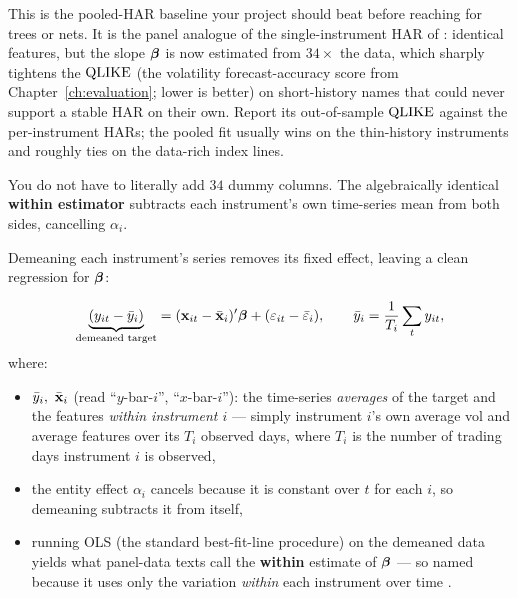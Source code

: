 \begin{projectconnection}
This is the pooled-HAR baseline your project should beat before reaching for
trees or nets.  It is the panel analogue of the single-instrument HAR of
\citet{Corsi2009}: identical features, but the slope $\bm{\beta}$ is now estimated
from $34\times$ the data, which sharply tightens the $\operatorname{QLIKE}$ (the volatility
forecast-accuracy score from Chapter~\ref{ch:evaluation}; lower is better) on
short-history names that could never support a stable HAR on their own.  Report its
out-of-sample $\operatorname{QLIKE}$ against the per-instrument HARs; the pooled fit usually wins on the
thin-history instruments and roughly ties on the data-rich index lines.
\end{projectconnection}

You do not have to literally add $34$ dummy columns.  The algebraically
identical \textbf{within estimator} subtracts each instrument's own time-series
mean from both sides, cancelling $\alpha_i$.

Demeaning each instrument's series removes its fixed effect,
leaving a clean regression for $\bm{\beta}$:

\begin{equation}\label{eq:panel-within}
  \underbrace{(y_{it} - \bar{y}_i)}_{\text{demeaned target}}
  = (\mathbf{x}_{it} - \bar{\mathbf{x}}_i)'\bm{\beta} + (\varepsilon_{it} - \bar{\varepsilon}_i),
  \qquad
  \bar{y}_i = \frac{1}{T_i}\sum_{t} y_{it},
\end{equation}
where:
\begin{itemize}[nosep]
  \item $\bar{y}_i,\ \bar{\mathbf{x}}_i$ (read ``$y$-bar-$i$'', ``$x$-bar-$i$''): the
        time-series \emph{averages} of the target and the features \emph{within
        instrument $i$} --- simply instrument $i$'s own average vol and average
        features over its $T_i$ observed days, where $T_i$ is the number of trading
        days instrument $i$ is observed,
  \item the entity effect $\alpha_i$ cancels because it is constant over $t$ for
        each $i$, so demeaning subtracts it from itself,
  \item running OLS (the standard best-fit-line procedure) on the demeaned data
        yields what panel-data texts call the \textbf{within} estimate of $\bm{\beta}$
        --- so named because it uses only the variation \emph{within} each
        instrument over time \citep{Wooldridge2010}.
\end{itemize}

